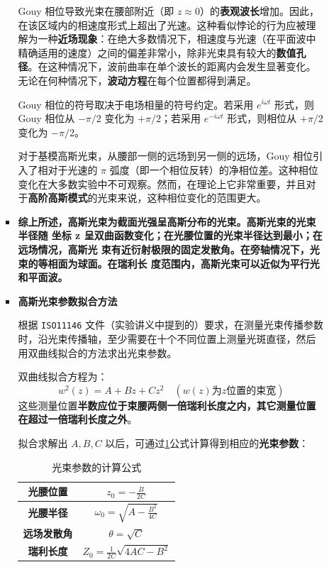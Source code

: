 \begin{enumerate}
\begin{enumerate}
\begin{itemize}
			Gouy 相位导致光束在腰部附近（即 $z \approx 0$）的\textbf{表观波长}增加。因此，在该区域内的相速度形式上超出了光速。这种看似悖论的行为应被理解为一种\textbf{近场现象}：在绝大多数情况下，相速度与光速（在平面波中精确适用的速度）之间的偏差非常小，除非光束具有较大的\textbf{数值孔径}。在这种情况下，波前曲率在单个波长的距离内会发生显著变化。无论在何种情况下，\textbf{波动方程}在每个位置都得到满足。
			
			Gouy 相位的符号取决于电场相量的符号约定。若采用 $e^{i\omega t}$ 形式，则 Gouy 相位从 $-\pi/2$ 变化为 $+\pi/2$；若采用 $e^{-i\omega t}$ 形式，则相位从 $+\pi/2$ 变化为 $-\pi/2$。
			
			对于基模高斯光束，从腰部一侧的远场到另一侧的远场，Gouy 相位引入了相对于光速的 $\pi$ 弧度（即一个相位反转）的净相位差。这种相位变化在大多数实验中不可观察。然而，在理论上它非常重要，并且对于\textbf{高阶高斯模式}的光束来说，这种相位变化的范围更大。
			
			\item \textbf{综上所述，高斯光束为截面光强呈高斯分布的光束。高斯光束的光束半径随
			坐标 z 呈双曲函数变化；在光腰位置的光束半径达到最小；在远场情况，高斯光
			束有近衍射极限的固定发散角。在旁轴情况下，光束的等相面为球面。在瑞利长
			度范围内，高斯光束可以近似为平行光和平面波。}
			
			\item \textbf{高斯光束参数拟合方法}
			
			根据 \texttt{ISO11146} 文件（实验讲义中提到的）要求，在测量光束传播参数时，沿光束传播轴，至少需要在十个不同位置上测量光斑直径，然后用双曲线拟合的方法求出光束参数。
			
			双曲线拟合方程为：
			\[
			w^2(z) = A + Bz + Cz^2 \quad (w(z) \text{为} z \text{位置的束宽})
			\]
			这些测量位置\textbf{半数应位于束腰两侧一倍瑞利长度之内，其它测量位置在超过一倍瑞利长度之外}。
			
			拟合求解出 $A, B, C$ 以后，可通过\cref{tab:eq}公式计算得到相应的\textbf{光束参数}：
			
			\begin{table}[h!]
				\centering
				\caption{光束参数的计算公式}
				\label{tab:eq}
				\begin{tabular}{|c|c|}
					\hline
					\textbf{光腰位置} & $z_0 = -\frac{B}{2C}$ \\
					\hline
					\textbf{光腰半径} & $\omega_0 = \sqrt{A - \frac{B^2}{4C}}$ \\
					\hline
					\textbf{远场发散角} & $\theta = \sqrt{C}$ \\
					\hline
					\textbf{瑞利长度} & $Z_0 = \frac{1}{2C} \sqrt{4AC - B^2}$ \\
					\hline
				\end{tabular}
			\end{table}
		\end{itemize}
		

\end{enumerate}
\end{enumerate}

